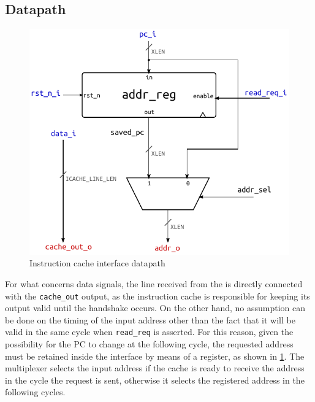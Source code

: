 \subsection{Datapath}
\begin{figure}[hbt]
  \centering
  \includegraphics{img/icache_ifc.pdf}
  \caption{Instruction cache interface datapath}
  \label{fig:icache_ifc}
\end{figure}
For what concerns data signals, the line received from the is directly connected with the \texttt{cache\_out} output, as the instruction cache is responsible for keeping its output valid until the handshake occurs. On the other hand, no assumption can be done on the timing of the input address other than the fact that it will be valid in the same cycle when \texttt{read\_req} is asserted. For this reason, given the possibility for the \ac{PC} to change at the following cycle, the requested address must be retained inside the interface by means of a register, as shown in \cref{fig:icache_ifc}. The multiplexer selects the input address if the cache is ready to receive the address in the cycle the request is sent, otherwise it selects the registered address in the following cycles.

